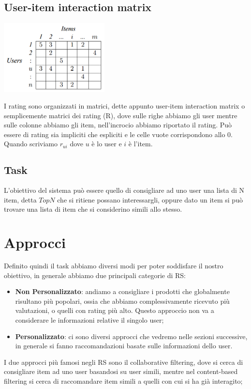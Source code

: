\subsection{User-item interaction matrix}
\begin{minipage}[H]{0.40\textwidth}
	\includegraphics[width=5.5cm]{figures/Sample-of-user-item-matrix}
\end{minipage}
\begin{minipage}[H]{0.55\textwidth}
	I rating sono organizzati in matrici, dette appunto user-item interaction matrix o semplicemente matrici dei rating (R), dove sulle righe abbiamo gli user mentre sulle colonne abbiamo gli item, nell'incrocio abbiamo riportato il rating. 
	Può essere di rating sia impliciti che espliciti e le celle vuote corrispondono allo 0.
	Quando scriviamo $r_{ui}$ dove $u$ è lo user e $i$ è l'item.
\end{minipage}

\subsection{Task}
L'obiettivo del sistema può essere quello di consigliare ad uno user una lista di N item, detta \textbf{$TopN$} che si ritiene possano interessargli, oppure dato un item si può trovare una lista di item che si considerino simili allo stesso.

\section{Approcci}
Definito quindi il task abbiamo diversi modi per poter soddisfare il nostro obiettivo, in generale abbiamo due principali categorie di RS:
\begin{itemize}
	\item \textbf{Non Personalizzato}: andiamo a consigliare i prodotti che globalmente risultano più popolari, ossia che abbiamo complessivamente ricevuto più valutazioni, o quelli con rating più alto. Questo approccio non va a considerare le informazioni relative il singolo user;
	\item \textbf{Personalizzato}: ci sono diversi approcci che vedremo nelle sezioni successive, in generale si fanno raccomandazioni basate sulle informazioni dello user.
\end{itemize}
I due approcci più famosi negli RS sono il collaborative filtering, dove si cerca di consigliare item ad uno user basandosi su user simili, mentre nel content-based filtering si cerca di raccomandare item simili a quelli con cui si ha già interagito;

